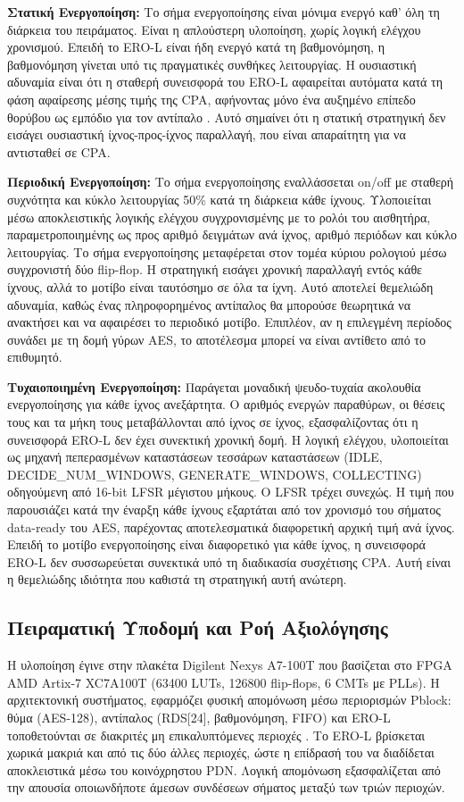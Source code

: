 \textbf{Στατική Ενεργοποίηση:} Το σήμα ενεργοποίησης είναι μόνιμα ενεργό καθ' όλη τη διάρκεια του πειράματος. Είναι η απλούστερη υλοποίηση, χωρίς λογική ελέγχου χρονισμού. Επειδή το ERO-L είναι ήδη ενεργό κατά τη βαθμονόμηση, η βαθμονόμηση γίνεται υπό τις πραγματικές συνθήκες λειτουργίας. Η ουσιαστική αδυναμία είναι ότι η σταθερή συνεισφορά του ERO-L αφαιρείται αυτόματα κατά τη φάση αφαίρεσης μέσης τιμής της CPA, αφήνοντας μόνο ένα αυξημένο επίπεδο θορύβου ως εμπόδιο για τον αντίπαλο \cite{mangard2007power}. Αυτό σημαίνει ότι η στατική στρατηγική δεν εισάγει ουσιαστική ίχνος-προς-ίχνος παραλλαγή, που είναι απαραίτητη για να αντισταθεί σε CPA.

\textbf{Περιοδική Ενεργοποίηση:} Το σήμα ενεργοποίησης εναλλάσσεται on/off με σταθερή συχνότητα και κύκλο λειτουργίας 50\% κατά τη διάρκεια κάθε ίχνους. Υλοποιείται μέσω αποκλειστικής λογικής ελέγχου συγχρονισμένης με το ρολόι του αισθητήρα, παραμετροποιημένης ως προς αριθμό δειγμάτων ανά ίχνος, αριθμό περιόδων και κύκλο λειτουργίας. Το σήμα ενεργοποίησης μεταφέρεται στον τομέα κύριου ρολογιού μέσω συγχρονιστή δύο flip-flop. Η στρατηγική εισάγει χρονική παραλλαγή εντός κάθε ίχνους, αλλά το μοτίβο είναι ταυτόσημο σε όλα τα ίχνη. Αυτό αποτελεί θεμελιώδη αδυναμία, καθώς ένας πληροφορημένος αντίπαλος θα μπορούσε θεωρητικά να ανακτήσει και να αφαιρέσει το περιοδικό μοτίβο. Επιπλέον, αν η επιλεγμένη περίοδος συνάδει με τη δομή γύρων AES, το αποτέλεσμα μπορεί να είναι αντίθετο από το επιθυμητό.

\textbf{Τυχαιοποιημένη Ενεργοποίηση:} Παράγεται μοναδική ψευδο-τυχαία ακολουθία ενεργοποίησης για κάθε ίχνος ανεξάρτητα. Ο αριθμός ενεργών παραθύρων, οι θέσεις τους και τα μήκη τους μεταβάλλονται από ίχνος σε ίχνος, εξασφαλίζοντας ότι η συνεισφορά ERO-L δεν έχει συνεκτική χρονική δομή. Η λογική ελέγχου, υλοποιείται ως μηχανή πεπερασμένων καταστάσεων τεσσάρων καταστάσεων (IDLE, DECIDE\_NUM\_WINDOWS, GENERATE\_WINDOWS, COLLECTING) οδηγούμενη από 16-bit LFSR μέγιστου μήκους. Ο LFSR τρέχει συνεχώς. Η τιμή που παρουσιάζει κατά την έναρξη κάθε ίχνους εξαρτάται από τον χρονισμό του σήματος data-ready του AES, παρέχοντας αποτελεσματικά διαφορετική αρχική τιμή ανά ίχνος. Επειδή το μοτίβο ενεργοποίησης είναι διαφορετικό για κάθε ίχνος, η συνεισφορά ERO-L δεν συσσωρεύεται συνεκτικά υπό τη διαδικασία συσχέτισης CPA. Αυτή είναι η θεμελιώδης ιδιότητα που καθιστά τη στρατηγική αυτή ανώτερη.

\subsection*{Πειραματική Υποδομή και Ροή Αξιολόγησης} 
Η υλοποίηση έγινε στην πλακέτα Digilent Nexys A7-100T που βασίζεται στο FPGA AMD Artix-7 XC7A100T (63400 LUTs, 126800 flip-flops, 6 CMTs με PLLs). Η αρχιτεκτονική συστήματος, εφαρμόζει φυσική απομόνωση μέσω περιορισμών Pblock: θύμα (AES-128), αντίπαλος (RDS[24], βαθμονόμηση, FIFO) και ERO-L τοποθετούνται σε διακριτές μη επικαλυπτόμενες περιοχές \cite{spielmann2023rds}. Το ERO-L βρίσκεται χωρικά μακριά και από τις δύο άλλες περιοχές, ώστε η επίδρασή του να διαδίδεται αποκλειστικά μέσω του κοινόχρηστου PDN. Λογική απομόνωση εξασφαλίζεται από την απουσία οποιωνδήποτε άμεσων συνδέσεων σήματος μεταξύ των τριών περιοχών.

